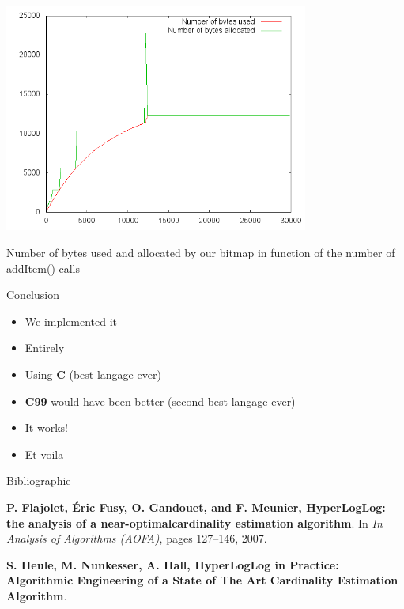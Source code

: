 \documentclass{beamer}
\begin{document}
\begin{frame}
	\begin{center}
		\includegraphics[width=10cm]{plot_memoryUsage.png} \\
	\end{center}
	Number of bytes used and allocated by our bitmap in function of the number of addItem() calls
\end{frame}

\begin{frame}{Conclusion}
  \begin{itemize}
    \item We implemented it
    \pause
    \item Entirely
    \pause
    \item Using \textbf{C} (best langage ever)
    \pause
    \item \textbf{C99} would have been better (second best langage ever)
    \pause
    \item It works!
    \pause 
    \item Et voila
  \end{itemize}
\end{frame}


\begin{frame}{Bibliographie}  \begin{thebibliography}{}

\textbf{P. Flajolet, Éric Fusy, O. Gandouet, and F. Meunier, HyperLogLog: the analysis of a near-optimalcardinality estimation algorithm}. In \emph{In Analysis of
Algorithms (AOFA)}, pages 127–146, 2007.

\textbf{S. Heule, M. Nunkesser, A. Hall, HyperLogLog in Practice: Algorithmic Engineering of a State of The Art Cardinality Estimation Algorithm}.

\end{thebibliography}

\end{frame}
\end{document}
